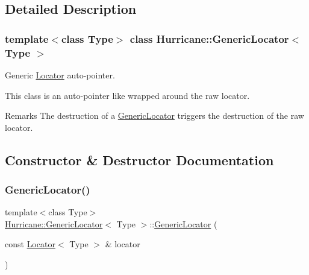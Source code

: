 \subsection{Detailed Description}
\subsubsection*{template$<$class Type$>$\newline
class Hurricane\+::\+Generic\+Locator$<$ Type $>$}

Generic \mbox{\hyperlink{classHurricane_1_1Locator}{Locator}} auto-\/pointer. 

This class is an auto-\/pointer like wrapped around the raw locator.

\begin{DoxyRemark}{Remarks}
The destruction of a \mbox{\hyperlink{classHurricane_1_1GenericLocator}{Generic\+Locator}} triggers the destruction of the raw locator. 
\end{DoxyRemark}


\subsection{Constructor \& Destructor Documentation}
\mbox{\label{classHurricane_1_1GenericLocator_a878eae335b3f60fc66ec6362d84c2b3e}} 
\subsubsection{\texorpdfstring{Generic\+Locator()}{GenericLocator()}\hspace{0.1cm}{\footnotesize\ttfamily [1/3]}}
{\footnotesize\ttfamily template$<$class Type$>$ \\
\mbox{\hyperlink{classHurricane_1_1GenericLocator}{Hurricane\+::\+Generic\+Locator}}$<$ Type $>$\+::\mbox{\hyperlink{classHurricane_1_1GenericLocator}{Generic\+Locator}} (\begin{DoxyParamCaption}\item[{const \mbox{\hyperlink{classHurricane_1_1Locator}{Locator}}$<$ Type $>$ \&}]{locator }\end{DoxyParamCaption})\hspace{0.3cm}{\ttfamily [inline]}}

